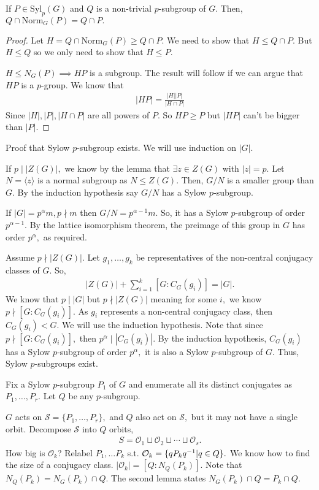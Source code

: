 \documentclass[a4paper]{article}
\begin{document}
\begin{lemma}
    If $P\in\mathrm{Syl}_p(G)$ and $Q$ is a non-trivial $p$-subgroup of $G.$ Then, $Q\cap\mathrm{Norm}_G(P)=Q\cap P.$
    \begin{proof}
        Let $H=Q\cap\mathrm{Norm}_G(P)\geq Q\cap P.$ We need to show that $H\leq Q\cap P.$
        But $H\leq Q$ so we only need to show that $H\leq P.$

        $H\leq N_G(P)\implies HP$ is a subgroup. The result will follow if we can argue that $HP$ is a $p$-group. We know that \begin{align}
            |HP|=\frac{|H||P|}{|H\cap P|}
        \end{align}
        Since $|H|,|P|,|H\cap P|$ are all powers of $P.$ So $HP\geq P$ but $|HP|$ can't be bigger than $|P|.$
    \end{proof}
\end{lemma}

Proof that Sylow $p$-subgroup exists. We will use induction on $|G|.$

If $p\mid |Z(G)|,$ we know by the lemma that $\exists z\in Z(G)$ with $|z|=p.$ Let $N=\langle z\rangle$ is a normal subgroup as $N\leq Z(G).$ Then, $G/N$ is a smaller group than $G.$ By the induction hypothesis say $G/N$ has a Sylow $p$-subgroup.

If $|G|=p^\alpha m,p\nmid m$ then $G/N=p^{\alpha-1}m.$ So, it has a Sylow $p$-subgroup of order $p^{\alpha-1}.$ By the lattice isomorphism theorem, the preimage of this group in $G$ has order $p^\alpha,$ as required.

Assume $p\nmid|Z(G)|.$ Let $g_1,\dots,g_k$ be representatives of the non-central conjugacy classes of $G.$ So,\begin{align}
    |Z(G)|+\sum_{i=1}^k[G:C_G(g_i)]=|G|.
\end{align}
We know that $p\mid |G|$ but $p\nmid |Z(G)|$ meaning for some $i,$ we know $p\nmid[G:C_G(g_i)].$ As $g_i$ represents a non-central conjugacy class, then $C_G(g_i)<G.$ We will use the induction hypothesis. Note that since $p\nmid[G:C_G(g_i)],$ then $p^\alpha\mid|C_G(g_i)|.$ By the induction hypothesis, $C_G(g_i)$ has a Sylow $p$-subgroup of order $p^\alpha,$ it is also a Sylow $p$-subgroup of $G.$ Thus, Sylow $p$-subgroups exist.

Fix a Sylow $p$-subgroup $P_1$ of $G$ and enumerate all its distinct conjugates as $P_1,\dots,P_r.$ Let $Q$ be any $p$-subgroup.

$G$ acts on $\mathcal S=\{P_1,\dots,P_r\},$ and $Q$ also act on $\mathcal S,$ but it may not have a single orbit. Decompose $\mathcal S$ into $Q$ orbits, \begin{align}
    S=\mathcal O_1\sqcup\mathcal O_2\sqcup\cdots\sqcup\mathcal O_s.
\end{align}
How big is $\mathcal O_k$? Relabel $P_1,\dots P_k$ s.t. $\mathcal O_k=\{qP_kq^{-1}|q\in Q\}.$ We know how to find the size of a conjugacy class. $|\mathcal O_k|=[Q:N_Q(P_k)].$ Note that $N_Q(P_k)=N_G(P_k)\cap Q.$ The second lemma states $N_G(P_k)\cap Q=P_k\cap Q.$
\end{document}
